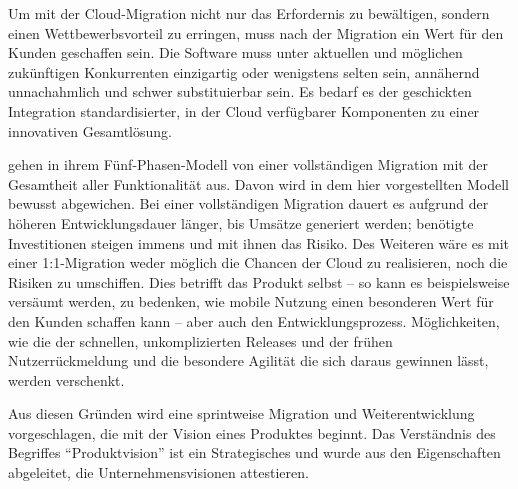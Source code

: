 Um mit der Cloud-Migration nicht nur das Erfordernis zu bewältigen, sondern 
einen Wettbewerbsvorteil zu erringen, muss nach der Migration ein Wert für den 
Kunden geschaffen sein. Die Software muss unter aktuellen und möglichen 
zukünftigen Konkurrenten einzigartig oder wenigstens selten sein, annähernd 
unnachahmlich und schwer substituierbar sein.
Es bedarf es der geschickten Integration standardisierter, in der Cloud 
verfügbarer Komponenten zu einer innovativen Gesamtlösung. 

 gehen in ihrem Fünf-Phasen-Modell von einer vollständigen 
Migration mit der Gesamtheit aller Funktionalität aus. Davon wird in dem hier 
vorgestellten Modell bewusst abgewichen. Bei einer vollständigen Migration 
dauert es aufgrund der höheren Entwicklungsdauer länger, bis Umsätze generiert 
werden; benötigte Investitionen steigen immens und mit ihnen das Risiko. Des 
Weiteren wäre es mit einer 1:1-Migration weder möglich die Chancen der 
Cloud zu realisieren, noch die Risiken zu umschiffen. Dies betrifft das 
Produkt selbst -- so kann es beispielsweise versäumt werden, zu bedenken, wie 
mobile Nutzung einen besonderen Wert für den Kunden schaffen kann -- aber auch 
den Entwicklungsprozess. Möglichkeiten, wie die der schnellen, unkomplizierten 
Releases und der frühen Nutzerrückmeldung und die besondere Agilität die sich 
daraus gewinnen lässt, werden verschenkt.

Aus diesen Gründen wird eine sprintweise Migration und 
Weiterentwicklung vorgeschlagen, die mit der Vision eines Produktes beginnt. 
Das Verständnis des Begriffes "`Produktvision"' ist ein Strategisches und wurde 
aus den Eigenschaften abgeleitet, die  
Unternehmensvisionen attestieren.

